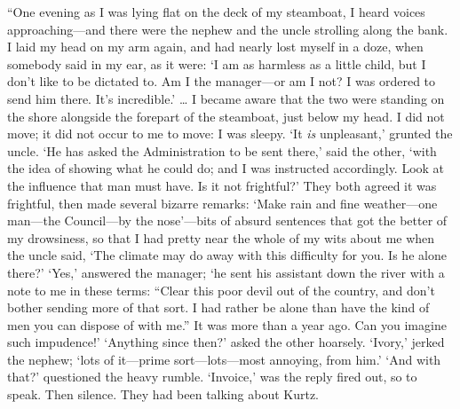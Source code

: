 \documentclass[12pt]{report}
\begin{document}
``One evening as I was lying flat on the deck of my steamboat, I heard
voices approaching---and there were the nephew and the uncle strolling
along the bank. I laid my head on my arm again, and had nearly lost
myself in a doze, when somebody said in my ear, as it were: `I am as
harmless as a little child, but I don't like to be dictated to. Am I the
manager---or am I not? I was ordered to send him there. It's
incredible.' \ldots{} I became aware that the two were standing on the
shore alongside the forepart of the steamboat, just below my head. I did
not move; it did not occur to me to move: I was sleepy. `It \emph{is}
unpleasant,' grunted the uncle. `He has asked the Administration to be
sent there,' said the other, `with the idea of showing what he could do;
and I was instructed accordingly. Look at the influence that man must
have. Is it not frightful?' They both agreed it was frightful, then made
several bizarre remarks: `Make rain and fine weather---one man---the
Council---by the nose'---bits of absurd sentences that got the better of
my drowsiness, so that I had pretty near the whole of my wits about me
when the uncle said, `The climate may do away with this difficulty for
you. Is he alone there?' `Yes,' answered the manager; `he sent his
assistant down the river with a note to me in these terms: ``Clear this
poor devil out of the country, and don't bother sending more of that
sort. I had rather be alone than have the kind of men you can dispose of
with me.'' It was more than a year ago. Can you imagine such impudence!'
`Anything since then?' asked the other hoarsely. `Ivory,' jerked the
nephew; `lots of it---prime sort---lots---most annoying, from him.' `And
with that?' questioned the heavy rumble. `Invoice,' was the reply fired
out, so to speak. Then silence. They had been talking about Kurtz.
\end{document}
